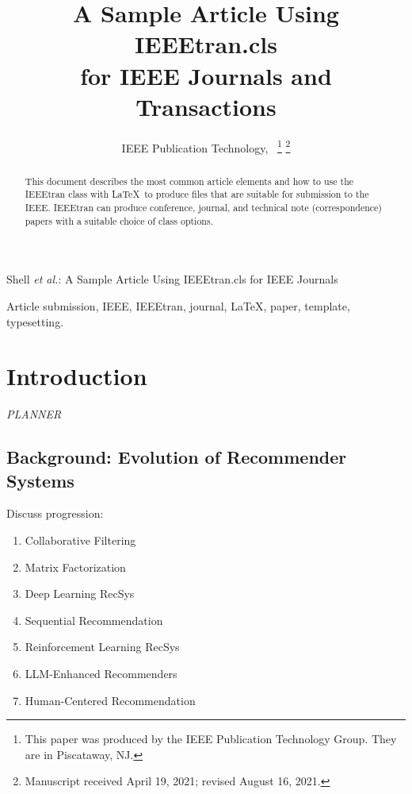 \documentclass[lettersize,journal]{IEEEtran}
\begin{document}
\title{A Sample Article Using IEEEtran.cls\\ for IEEE Journals and Transactions}

\author{IEEE Publication Technology,~
\thanks{This paper was produced by the IEEE Publication Technology Group. They are in Piscataway, NJ.}%
\thanks{Manuscript received April 19, 2021; revised August 16, 2021.}}

%
{Shell \MakeLowercase{\textit{et al.}}: A Sample Article Using IEEEtran.cls for IEEE Journals}


\maketitle

\begin{abstract}
This document describes the most common article elements and how to use the IEEEtran class with \LaTeX \ to produce files that are suitable for submission to the IEEE.  IEEEtran can produce conference, journal, and technical note (correspondence) papers with a suitable choice of class options. 
\end{abstract}

\begin{IEEEkeywords}
Article submission, IEEE, IEEEtran, journal, \LaTeX, paper, template, typesetting.
\end{IEEEkeywords}

% 
\section{Introduction}

\emph{PLANNER}

\subsection{Background: Evolution of Recommender Systems}

Discuss progression:

\begin{enumerate}
    \item Collaborative Filtering
    \item Matrix Factorization
    \item Deep Learning RecSys
    \item Sequential Recommendation
    \item Reinforcement Learning RecSys
    \item LLM-Enhanced Recommenders
    \item Human-Centered Recommendation
\end{enumerate}
\end{document}
